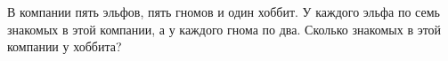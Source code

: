 В компании пять эльфов, пять гномов и один хоббит. У каждого эльфа по семь знакомых в этой компании, а у каждого гнома по два. Сколько знакомых в этой компании у хоббита?